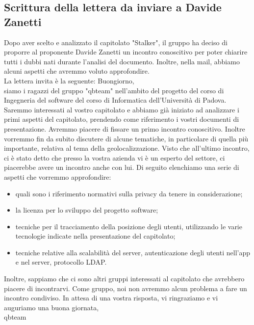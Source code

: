 \subsection{Scrittura della lettera da inviare a Davide Zanetti}
Dopo aver scelto e analizzato il capitolato "Stalker", il gruppo ha deciso di proporre al proponente Davide Zanetti un incontro conoscitivo per poter chiarire tutti i dubbi nati durante l'analisi del documento. Inoltre, nella mail, abbiamo alcuni aspetti che avremmo voluto approfondire.
\\La lettera invita è la seguente:
\bigskip
\newline
Buongiorno,
\\siamo i ragazzi del gruppo "qbteam" nell'ambito del progetto del corso di Ingegneria del software del corso di Informatica dell'Università di Padova. Saremmo interessati al vostro capitolato e abbiamo già iniziato ad analizzare i primi aspetti del capitolato, prendendo come riferimento i vostri documenti di presentazione. Avremmo piacere di fissare un primo incontro conoscitivo. Inoltre vorremmo fin da subito discutere di alcune tematiche, in particolare di quella più importante, relativa al tema della geolocalizzazione. Visto che all'ultimo incontro, ci è stato detto che presso la vostra azienda vi è un esperto del settore, ci piacerebbe avere un incontro anche con lui. Di seguito elenchiamo una serie di aspetti che vorremmo approfondire:
\begin{itemize}
	\item quali sono i riferimento normativi sulla privacy da tenere in considerazione;
	\item la licenza per lo sviluppo del progetto software;
	\item tecniche per il tracciamento della posizione degli utenti, utilizzando le varie tecnologie indicate nella presentazione del capitolato;
	\item tecniche relative alla scalabilità del server, autenticazione degli utenti nell'app e nel server, protocollo LDAP.
\end{itemize}
Inoltre, sappiamo che ci sono altri gruppi interessati al capitolato che avrebbero piacere di incontrarvi. Come gruppo, noi non avremmo alcun problema a fare un incontro condiviso.
In attesa di una vostra risposta, vi ringraziamo e vi auguriamo una buona giornata,
\\qbteam

